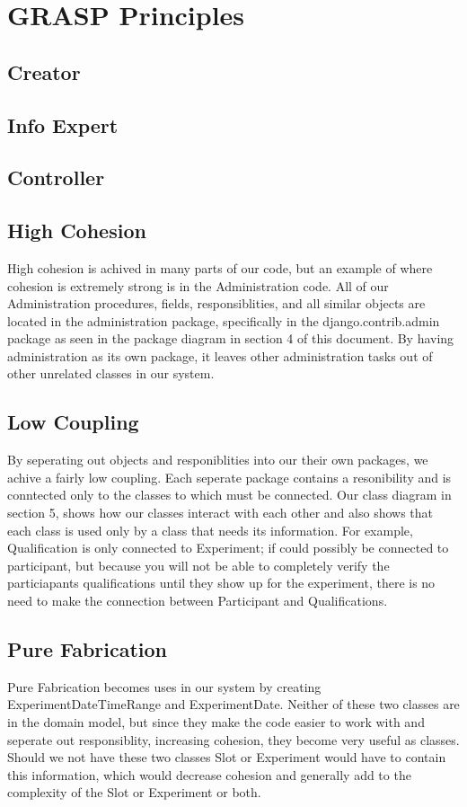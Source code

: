 \section{GRASP Principles}
\subsection{Creator}

\subsection{Info Expert}

\subsection{Controller}

\subsection{High Cohesion}
High cohesion is achived in many parts of our code, but an example of where cohesion is extremely strong is in the Administration code.  All of our Administration  procedures, fields, responsiblities, and all similar objects are located in the administration package, specifically in the django.contrib.admin package as seen in the package diagram in section 4 of this document.  By having administration as its own package, it leaves other administration tasks out of other unrelated classes in our system.

\subsection{Low Coupling}
By seperating out objects and responiblities into our their own packages, we achive a fairly low coupling.  Each seperate package contains a resonibility and is conntected only to the classes to which must be connected.  Our class diagram in section 5, shows how our classes interact with each other and also shows that each class is used only by a class that needs its information.  For example, Qualification is only connected to Experiment; if could possibly be connected to participant, but because you will not be able to completely verify the particiapants qualifications until they show up for the experiment, there is no need to make the connection between Participant and Qualifications.

\subsection{Pure Fabrication}
Pure Fabrication becomes uses in our system by creating ExperimentDateTimeRange and ExperimentDate.  Neither of these two classes are in the domain model, but since they make the code easier to work with and seperate out responsiblity, increasing cohesion, they become very useful as classes.  Should we not have these two classes Slot or Experiment would have to contain this information, which would decrease cohesion and generally add to the complexity of the Slot or Experiment or both.

